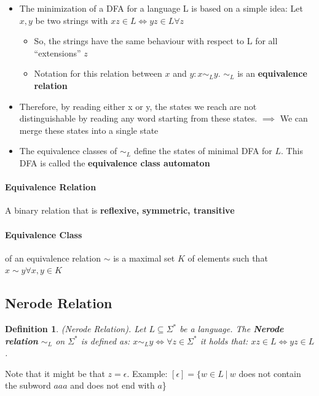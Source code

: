 \documentclass[a3paper, 8pt]{extarticle}
\newtheorem*{definition}{Definition}
\begin{document}
\begin{multicols*}{6}
\begin{itemize}
    \item The minimization of a DFA for a language L is based on a simple idea: Let $x,y$ be two strings with $xz \in L \iff yz \in L \forall z$
    \begin{itemize}
        \item So, the strings have the same behaviour with respect to L for all “extensions” $z$
        \item Notation for this relation between $x$ and $y: x \sim_L y$. $\sim_L$ is an \textbf{equivalence relation}
    \end{itemize}
    \item Therefore, by reading either x or y, the states we reach are not distinguishable by reading any word starting from these states. $\implies$  We can merge these states into a single state
    \item The equivalence classes of $\sim_L$ define the states of minimal DFA for $L$. This DFA is called the \textbf{equivalence class automaton}
\end{itemize}

\paragraph{Equivalence Relation}
A binary relation that is \textbf{reflexive, symmetric, transitive}

\paragraph{Equivalence Class} of an equivalence relation $\sim$ is a maximal set $K$ of elements such that $x \sim y \forall x,y \in K$

\subsection{Nerode Relation} 
\begin{definition}
    (Nerode Relation). Let $L \subseteq \Sigma^*$ be a language. The \textbf{Nerode relation} $\sim_L$ on $\Sigma^*$ is defined as: $x \sim_L y \Leftrightarrow \forall z \in \Sigma^*$ it holds that: $xz \in L \Leftrightarrow yz \in L$.
\end{definition}
Note that it might be that $z=\epsilon$. Example: $[\epsilon]=\{ w \in L \ | \ w$ does not contain the subword $aaa$ and does not end with $a$\}

\end{multicols*}
\end{document}
